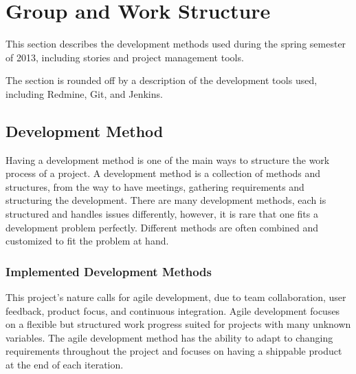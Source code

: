 \section{Group and Work Structure}
This section describes the development methods used during the spring semester of 2013, including stories and project management tools.

The section is rounded off by a description of the development tools used, including Redmine, Git, and Jenkins.

\subsection{Development Method}
\label{sec:development}
Having a development method is one of the main ways to structure the work process of a project.
A development method is a collection of methods and structures, from the way to have meetings, gathering requirements and structuring the development.
There are many development methods, each is structured and handles issues differently,
however, it is rare that one fits a development problem perfectly.
Different methods are often combined and customized to fit the problem at hand.

\subsubsection{Implemented Development Methods}
\label{subsub:implementedDevelopmentMethods}
This project's nature calls for agile development, due to team collaboration, user feedback, product focus, and continuous integration.
Agile development focuses on a flexible but structured work progress suited for projects with many unknown variables.
The agile development method has the ability to adapt to changing requirements throughout the project and focuses on having a shippable product at the end of each iteration. %

